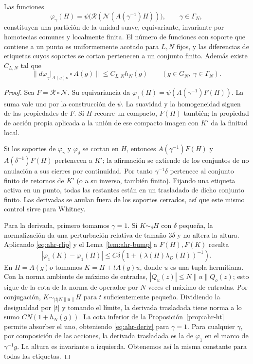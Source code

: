 \begin{teorema}
\label{thm:ahr-spu}
Las funciones
\begin{equation}
 \varphi_\gamma(H)=\psi\bigl(\mathcal R(\mathcal N(A(\gamma^{-1})H))\bigr),
 \qquad \gamma\in\Gamma_N,
 \label{eq:ahr-particion}
\end{equation}
constituyen una partición de la unidad suave, equivariante, invariante por homotecias comunes y localmente finita. El número de funciones con soporte que contiene a un punto es uniformemente acotado para $L,N$ fijos, y las diferencias de etiquetas cuyos soportes se cortan pertenecen a un conjunto finito. Además existe $C_{L,N}$ tal que
\begin{equation}
 \|d\varphi_\gamma|_{A(g)o}\circ A(g)\|\le C_{L,N} h_N(g)
 \qquad(g\in G_N,\ \gamma\in\Gamma_N).
 \label{eq:ahr-deriv}
\end{equation}
\end{teorema}
\begin{proof}
Sea $F=\mathcal R\circ\mathcal N$. Su equivariancia da $\varphi_\gamma(H)=\psi(A(\gamma^{-1})F(H))$. La suma vale uno por la construcción de $\psi$. La suavidad y la homogeneidad siguen de las propiedades de $F$. Si $H$ recorre un compacto, $F(H)$ también; la propiedad de acción propia aplicada a la unión de ese compacto imagen con $K'$ da la finitud local.

Si los soportes de $\varphi_\gamma$ y $\varphi_\delta$ se cortan en $H$, entonces $A(\gamma^{-1})F(H)$ y $A(\delta^{-1})F(H)$ pertenecen a $K'$; la afirmación se extiende de los conjuntos de no anulación a sus cierres por continuidad. Por tanto $\gamma^{-1}\delta$ pertenece al conjunto finito de retornos de $K'$ (o a su inverso, también finito). Fijando una etiqueta activa en un punto, todas las restantes están en un trasladado de dicho conjunto finito. Las derivadas se anulan fuera de los soportes cerrados, así que este mismo control sirve para Whitney.

Para la derivada, primero tomamos $\gamma=1$. Si $K\sim_\delta H$ con $\delta$ pequeña, la normalización da una perturbación relativa de tamaño $3\delta$ y no altera la altura. Aplicando \eqref{eq:ahr-rlip} y el Lema~\ref{lem:ahr-bump} a $F(H),F(K)$ resulta
\[
 |\varphi_1(K)-\varphi_1(H)|\le C\delta(1+(\lambda(H)\lambda_D(H))^{-1}).
\]
En $H=A(g)o$ tomamos $K=H+tA(g)u$, donde $u$ es una tupla hermitiana. Con la norma ambiente de máximo de entradas, $|Q_u(z)|\le N\|u\|Q_o(z)$; esto sigue de la cota de la norma de operador por $N$ veces el máximo de entradas. Por conjugación, $K\sim_{|t|N\|u\|}H$ para $t$ suficientemente pequeño. Dividiendo la desigualdad por $|t|$ y tomando el límite, la derivada trasladada tiene norma a lo sumo $CN(1+h_N(g))$. La cota inferior de la Proposición~\ref{prop:ahr-ht} permite absorber el uno, obteniendo \eqref{eq:ahr-deriv} para $\gamma=1$. Para cualquier $\gamma$, por composición de las acciones, la derivada trasladada es la de $\varphi_1$ en el marco de $\gamma^{-1}g$. La altura es invariante a izquierda. Obtenemos así la misma constante para todas las etiquetas.
\end{proof}

